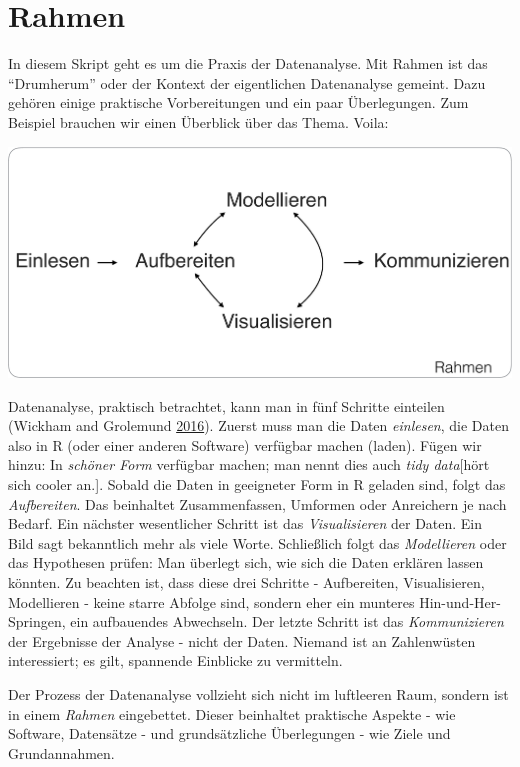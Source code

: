 \documentclass[12pt,]{book}
\begin{document}
\chapter{Rahmen}\label{rahmen}

In diesem Skript geht es um die Praxis der Datenanalyse. Mit Rahmen ist
das ``Drumherum'' oder der Kontext der eigentlichen Datenanalyse
gemeint. Dazu gehören einige praktische Vorbereitungen und ein paar
Überlegungen. Zum Beispiel brauchen wir einen Überblick über das Thema.
Voila:

\begin{center}\includegraphics[width=0.7\linewidth]{images/Prozess_Datenanalyse} \end{center}

Datenanalyse, praktisch betrachtet, kann man in fünf Schritte einteilen
(Wickham and Grolemund \protect\hyperlink{ref-r4ds}{2016}). Zuerst muss
man die Daten \emph{einlesen}, die Daten also in R (oder einer anderen
Software) verfügbar machen (laden). Fügen wir hinzu: In \emph{schöner
Form} verfügbar machen; man nennt dies auch \emph{tidy data}{[}hört sich
cooler an.{]}. Sobald die Daten in geeigneter Form in R geladen sind,
folgt das \emph{Aufbereiten}. Das beinhaltet Zusammenfassen, Umformen
oder Anreichern je nach Bedarf. Ein nächster wesentlicher Schritt ist
das \emph{Visualisieren} der Daten. Ein Bild sagt bekanntlich mehr als
viele Worte. Schließlich folgt das \emph{Modellieren} oder das
Hypothesen prüfen: Man überlegt sich, wie sich die Daten erklären lassen
könnten. Zu beachten ist, dass diese drei Schritte - Aufbereiten,
Visualisieren, Modellieren - keine starre Abfolge sind, sondern eher ein
munteres Hin-und-Her-Springen, ein aufbauendes Abwechseln. Der letzte
Schritt ist das \emph{Kommunizieren} der Ergebnisse der Analyse - nicht
der Daten. Niemand ist an Zahlenwüsten interessiert; es gilt, spannende
Einblicke zu vermitteln.

Der Prozess der Datenanalyse vollzieht sich nicht im luftleeren Raum,
sondern ist in einem \emph{Rahmen} eingebettet. Dieser beinhaltet
praktische Aspekte - wie Software, Datensätze - und grundsätzliche
Überlegungen - wie Ziele und Grundannahmen.
\end{document}
